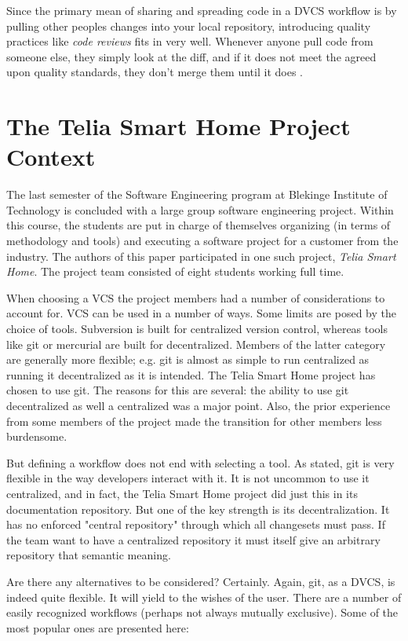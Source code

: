 \documentclass{llncs}
\begin{document}
Since the primary mean of sharing and spreading code in a DVCS
workflow is by pulling other peoples changes into your local
repository, introducing quality practices like \emph{code reviews}
fits in very well. Whenever anyone pull code from someone else, they
simply look at the diff, and if it does not meet the agreed upon
quality standards, they don't merge them until it does
\cite{osullivan09}.

\section{The Telia Smart Home Project Context}
\label{sec:telia}

The last semester of the Software Engineering program at Blekinge
Institute of Technology is concluded with a large group software
engineering project. Within this course, the students are put in
charge of themselves organizing (in terms of methodology and tools)
and executing a software project for a customer from the industry. The
authors of this paper participated in one such project, \emph{Telia
  Smart Home}. The project team consisted of eight students working
full time.

When choosing a VCS the project members had a number of considerations
to account for. VCS can be used in a number of ways. Some limits are
posed by the choice of tools. Subversion is built for centralized
version control, whereas tools like git or mercurial are built for
decentralized. Members of the latter category are generally more
flexible; e.g. git is almost as simple to run centralized as running
it decentralized as it is intended. The Telia Smart Home project has
chosen to use git. The reasons for this are several: the ability to
use git decentralized as well a centralized was a major point. Also,
the prior experience from some members of the project made the
transition for other members less burdensome.

But defining a workflow does not end with selecting a tool. As stated,
git is very flexible in the way developers interact with it. It is not
uncommon to use it centralized, and in fact, the Telia Smart Home
project did just this in its documentation repository. But one of the
key strength is its decentralization. It has no enforced "central
repository" through which all changesets must pass. If the team want
to have a centralized repository it must itself give an arbitrary
repository that semantic meaning.

Are there any alternatives to be considered? Certainly. Again, git, as
a DVCS, is indeed quite flexible. It will yield to the wishes of the
user. There are a number of easily recognized workflows (perhaps not
always mutually exclusive). Some of the most popular ones are
presented here:
\end{document}
